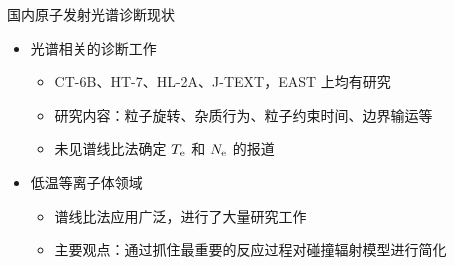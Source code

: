 \begin{CJK*}{UTF8}{kai}
\begin{frame}{国内原子发射光谱诊断现状}
	\begin{itemize}
		\item 光谱相关的诊断工作
			\begin{itemize}
				\item CT-6B、HT-7、HL-2A、J-TEXT，EAST 上均有研究
				\item 研究内容：粒子旋转、杂质行为、粒子约束时间、边界输运等
				\item 未见谱线比法确定 $T_{\rm e}$ 和 $N_{\rm e}$ 的报道
			\end{itemize}
		\bigskip
		\item 低温等离子体领域
			\begin{itemize}
				\item 谱线比法应用广泛，进行了大量研究工作 
				\item 主要观点：通过抓住最重要的反应过程对碰撞辐射模型进行简化\\ 
			\end{itemize}
	\end{itemize}
\end{frame}


\end{CJK*}

